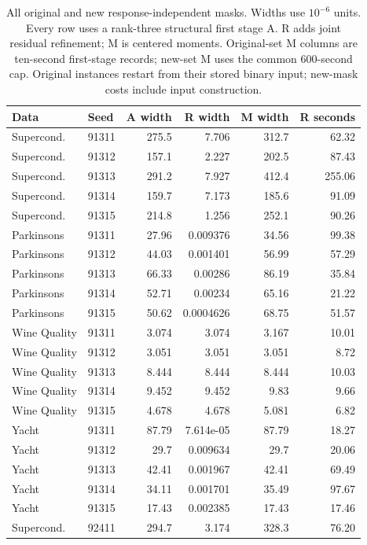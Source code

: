 \begin{table}[t]\centering\small
\caption{All original and new response-independent masks. Widths use $10^{-6}$ units. Every row uses a rank-three structural first stage A. R adds joint residual refinement; M is centered moments. Original-set M columns are ten-second first-stage records; new-set M uses the common 600-second cap. Original instances restart from their stored binary input; new-mask costs include input construction.}\label{tab:independent-details-v91}
\begin{tabular}{llrrrr}\toprule Data&Seed&A width&R width&M width&R seconds\\\midrule
Supercond. & 91311 & 275.5 & 7.706 & 312.7 & 62.32\\
Supercond. & 91312 & 157.1 & 2.227 & 202.5 & 87.43\\
Supercond. & 91313 & 291.2 & 7.927 & 412.4 & 255.06\\
Supercond. & 91314 & 159.7 & 7.173 & 185.6 & 91.09\\
Supercond. & 91315 & 214.8 & 1.256 & 252.1 & 90.26\\
Parkinsons & 91311 & 27.96 & 0.009376 & 34.56 & 99.38\\
Parkinsons & 91312 & 44.03 & 0.001401 & 56.99 & 57.29\\
Parkinsons & 91313 & 66.33 & 0.00286 & 86.19 & 35.84\\
Parkinsons & 91314 & 52.71 & 0.00234 & 65.16 & 21.22\\
Parkinsons & 91315 & 50.62 & 0.0004626 & 68.75 & 51.57\\
Wine Quality & 91311 & 3.074 & 3.074 & 3.167 & 10.01\\
Wine Quality & 91312 & 3.051 & 3.051 & 3.051 & 8.72\\
Wine Quality & 91313 & 8.444 & 8.444 & 8.444 & 10.03\\
Wine Quality & 91314 & 9.452 & 9.452 & 9.83 & 9.66\\
Wine Quality & 91315 & 4.678 & 4.678 & 5.081 & 6.82\\
Yacht & 91311 & 87.79 & 7.614e-05 & 87.79 & 18.27\\
Yacht & 91312 & 29.7 & 0.009634 & 29.7 & 20.06\\
Yacht & 91313 & 42.41 & 0.001967 & 42.41 & 69.49\\
Yacht & 91314 & 34.11 & 0.001701 & 35.49 & 97.67\\
Yacht & 91315 & 17.43 & 0.002385 & 17.43 & 17.46\\
\midrule
Supercond. & 92411 & 294.7 & 3.174 & 328.3 & 76.20\\

\end{tabular}
\end{table}
